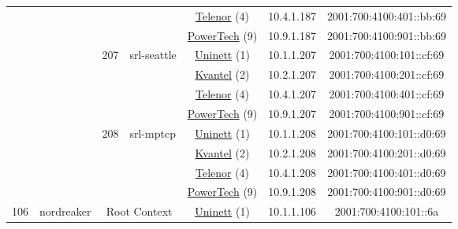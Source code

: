 \begin{small}
\begin{center}
\begin{longtable}{|c|c|c|c|c|c|c|c|}
  &  &  &  & \multicolumn{2}{|c|}{\tiny{\href{https://www.telenor.no}{Telenor} (4)}} & \tiny{10.4.1.187} & \tiny{2001:700:4100:401::bb:69} \\* \cline{5-5}\cline{6-6}\cline{7-7}\cline{8-8}
  &  &  &  & \multicolumn{2}{|c|}{\tiny{\href{http://www.powertech.no}{PowerTech} (9)}} & \tiny{10.9.1.187} & \tiny{2001:700:4100:901::bb:69} \\* \cline{3-3}\cline{4-4}\cline{5-5}\cline{6-6}\cline{7-7}\cline{8-8}
  &  & \multirow{4}{*}{\tiny{207}} & \multicolumn{1}{|l|}{\multirow{4}{*}{\tiny{srl-seattle}}} & \multicolumn{2}{|c|}{\tiny{\href{https://www.uninett.no}{Uninett} (1)}} & \tiny{10.1.1.207} & \tiny{2001:700:4100:101::cf:69} \\* \cline{5-5}\cline{6-6}\cline{7-7}\cline{8-8}
  &  &  &  & \multicolumn{2}{|c|}{\tiny{\href{http://kvantel.no}{Kvantel} (2)}} & \tiny{10.2.1.207} & \tiny{2001:700:4100:201::cf:69} \\* \cline{5-5}\cline{6-6}\cline{7-7}\cline{8-8}
  &  &  &  & \multicolumn{2}{|c|}{\tiny{\href{https://www.telenor.no}{Telenor} (4)}} & \tiny{10.4.1.207} & \tiny{2001:700:4100:401::cf:69} \\* \cline{5-5}\cline{6-6}\cline{7-7}\cline{8-8}
  &  &  &  & \multicolumn{2}{|c|}{\tiny{\href{http://www.powertech.no}{PowerTech} (9)}} & \tiny{10.9.1.207} & \tiny{2001:700:4100:901::cf:69} \\* \cline{3-3}\cline{4-4}\cline{5-5}\cline{6-6}\cline{7-7}\cline{8-8}
  &  & \multirow{4}{*}{\tiny{208}} & \multicolumn{1}{|l|}{\multirow{4}{*}{\tiny{srl-mptcp}}} & \multicolumn{2}{|c|}{\tiny{\href{https://www.uninett.no}{Uninett} (1)}} & \tiny{10.1.1.208} & \tiny{2001:700:4100:101::d0:69} \\* \cline{5-5}\cline{6-6}\cline{7-7}\cline{8-8}
  &  &  &  & \multicolumn{2}{|c|}{\tiny{\href{http://kvantel.no}{Kvantel} (2)}} & \tiny{10.2.1.208} & \tiny{2001:700:4100:201::d0:69} \\* \cline{5-5}\cline{6-6}\cline{7-7}\cline{8-8}
  &  &  &  & \multicolumn{2}{|c|}{\tiny{\href{https://www.telenor.no}{Telenor} (4)}} & \tiny{10.4.1.208} & \tiny{2001:700:4100:401::d0:69} \\* \cline{5-5}\cline{6-6}\cline{7-7}\cline{8-8}
  &  &  &  & \multicolumn{2}{|c|}{\tiny{\href{http://www.powertech.no}{PowerTech} (9)}} & \tiny{10.9.1.208} & \tiny{2001:700:4100:901::d0:69} \\ \hline
 \multirow{48}{*}{\tiny{106}} & \multicolumn{1}{|l|}{\multirow{48}{*}{\tiny{nordreaker}}} & \multicolumn{2}{|c|}{\multirow{4}{*}{\tiny{Root Context}}} & \multicolumn{2}{|c|}{\tiny{\href{https://www.uninett.no}{Uninett} (1)}} & \tiny{10.1.1.106} & \tiny{2001:700:4100:101::6a} \\* \cline{5-5}\cline{6-6}\cline{7-7}\cline{8-8}

\end{longtable}
\end{center}
\end{small}
